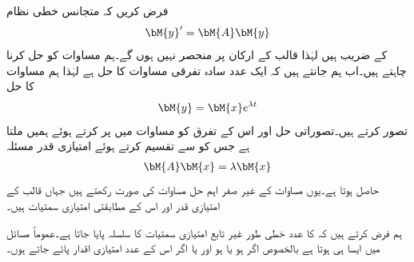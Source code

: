 فرض کریں کہ متجانس خطی نظام
\begin{align}\label{مساوات_نظام_مستقل_عددی_سر_نظام_الف}
\bM{y}'=\bM{A}\bM{y}
\end{align}
کے  ضریب   ہیں لہٰذا  قالب  کے ارکان  پر منحصر نہیں ہوں گے۔ہم مساوات  کو حل کرنا چاہتے ہیں۔اب ہم جانتے ہیں کہ ایک عدد سادہ تفرقی مساوات  کا حل  ہے لہٰذا ہم مساوات  کا حل 
\begin{align}\label{مساوات_نظام_مستقل_عددی_سر_نظام_ب}
\bM{y}=\bM{x}e^{\lambda t}
\end{align}
تصور کرتے ہیں۔تصوراتی حل اور اس کے تفرق  کو مساوات  میں پر کرتے ہوئے  ہمیں  ملتا ہے جس کو  سے تقسیم کرتے ہوئے امتیازی قدر مسئلہ
\begin{align}\label{مساوات_نظام_مستقل_عددی_سر_نظام_پ}
\bM{A}\bM{x}=\lambda \bM{x}
\end{align}
حاصل ہوتا ہے۔یوں مساوات  کے غیر صفر اہم حل مساوات  کی صورت رکھتے ہیں جہاں  قالب  کے امتیازی قدر اور  اس کے مطابقتی امتیازی سمتیات ہیں۔

ہم فرض کرتے ہیں کہ  کا  عدد خطی طور غیر تابع امتیازی سمتیات کا سلسلہ پایا جاتا ہے۔عموماً مسائل میں ایسا ہی ہوتا ہے  بالخصوص اگر   ہو  یا   ہو اور یا اگر اس کے  عدد  امتیازی اقدار پائے جاتے ہوں۔

